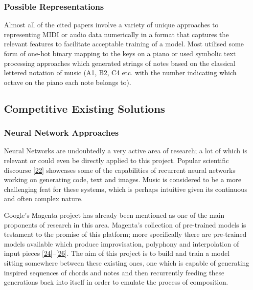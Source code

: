 \documentclass[12pt,]{article}
\begin{document}
\hypertarget{possible-representations}{%
\subsubsection{Possible
Representations}\label{possible-representations}}

Almost all of the cited papers involve a variety of unique approaches to
representing MIDI or audio data numerically in a format that captures
the relevant features to facilitate acceptable training of a model. Most
utilised some form of one-hot binary mapping to the keys on a piano or
used symbolic text processing approaches which generated strings of
notes based on the classical lettered notation of music (A1, B2, C4 etc.
with the number indicating which octave on the piano each note belongs
to).

\hypertarget{competitive-existing-solutions}{%
\subsection{Competitive Existing
Solutions}\label{competitive-existing-solutions}}

\hypertarget{neural-network-approaches}{%
\subsubsection{Neural Network
Approaches}\label{neural-network-approaches}}

Neural Networks are undoubtedly a very active area of research; a lot of
which is relevant or could even be directly applied to this project.
Popular scientific discourse
{[}\protect\hyperlink{ref-alextavgen}{22}{]} showcases some of the
capabilities of recurrent neural networks working on generating code,
text and images. Music is considered to be a more challenging feat for
these systems, which is perhaps intuitive given its continuous and often
complex nature.

Google's Magenta project has already been mentioned as one of the main
proponents of research in this area. Magenta's collection of pre-trained
models is testament to the promise of this platform; more specifically
there are pre-trained models available which produce improvisation,
polyphony and interpolation of input pieces
{[}\protect\hyperlink{ref-magentaimprov}{24}{]}--{[}\protect\hyperlink{ref-magentapolyphony}{26}{]}.
The aim of this project is to build and train a model sitting somewhere
between these existing ones, one which is capable of generating inspired
sequences of chords and notes and then recurrently feeding these
generations back into itself in order to emulate the process of
composition.
\end{document}
